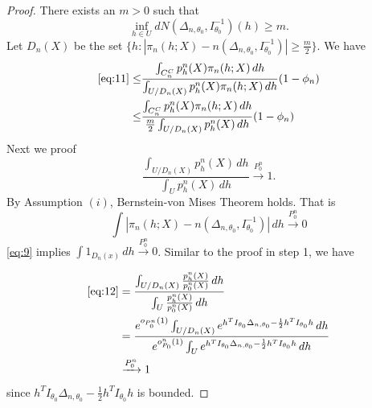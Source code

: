 \begin{proof}
    There exists an $m>0$ such that
\begin{equation}
    \inf_{h\in U} dN(\Delta_{n,\theta_0},I_{\theta_0}^{-1})(h)\geq m.
\end{equation}
Let $D_n(X)$ be the set $\{h: |\pi_{n}(h;X)-n(\Delta_{n,\theta_{0}},I_{\theta_{0}}^{-1})|\geq\frac{m}{2}\}$. We have
\begin{equation}\label{eq:13}
    \begin{aligned}
        \eqref{eq:11}\leq&\frac{\int_{C_n^C}p_h^n(X)\pi_n(h;X)\, dh}{\int_{U/D_n(X)} p_h^n(X)\pi_n(h;X)\, dh}(1-\phi_n)\\
        \leq&\frac{\int_{C_n^C}p_h^n(X)\pi_n(h;X)\, dh}{\frac{m}{2}\int_{U/D_n(X)} p_h^n(X)\, dh}(1-\phi_n)\\
    \end{aligned}
\end{equation}
Next we proof
\begin{equation}\label{eq:12}
    \frac{\int_{U/D_n(X)} p_h^n(X)\, dh}{\int_U p_h^n(X)\, dh}\xrightarrow{P_0^n}1.
\end{equation}
By Assumption $(i)$, Bernstein-von Mises Theorem holds. That is
\begin{equation}\label{eq:9}
 \int |\pi_{n}(h;X)-n(\Delta_{n,\theta_{0}},I_{\theta_{0}}^{-1})|\, dh\xrightarrow{P_0^n}0   
\end{equation}
\eqref{eq:9} implies $\int 1_{D_n(x)}\, dh\xrightarrow{P_0^n}0$. Similar to the proof in step 1, we have

\begin{equation}
\begin{aligned}
    \eqref{eq:12}&=\frac{\int_{U/D_n(X)} \frac{p_h^n(X)}{p_0^n(X)}\, dh}{\int_U \frac{p_h^n(X)}{p_0^n(X)}\, dh}\\
                 &=\frac{e^{o_{P^n_0}(1)}\int_{U/D_n(X)} e^{h^T I_{\theta_0}\Delta_{n,\theta_0}-\frac{1}{2}h^TI_{\theta_0}h} \, dh}{e^{o^n_{P_0}(1)}\int_U e^{h^T I_{\theta_0}\Delta_{n,\theta_0}-\frac{1}{2}h^TI_{\theta_0}h} \, dh}\\
                 &\xrightarrow{P_0^n} 1
\end{aligned}
\end{equation}
since $h^T I_{\theta_0}\Delta_{n,\theta_0}-\frac{1}{2}h^TI_{\theta_0}h$ is bounded.



\end{proof}
